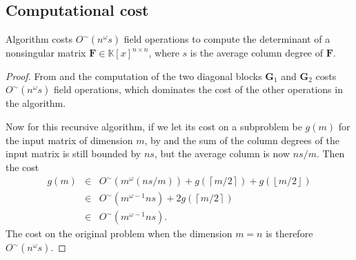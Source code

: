 
\subsection{Computational cost}
\begin{thm}
\label{thm:diagonalCost} Algorithm  %
costs $O^{\sim}\left(n^{\omega}s\right)$ field operations to compute
the determinant of a nonsingular matrix $\mathbf{F}\in\mathbb{K}\left[x\right]^{n\times n}$,
where $s$ is the average column degree of $\mathbf{F}$. \end{thm}
\begin{proof}
From  and 
the computation of the two diagonal blocks $\mathbf{G}_{1}$ and $\mathbf{G}_{2}$
costs $O^{\sim}\left(n^{\omega}s\right)$ field operations, which
dominates the cost of the other operations in the algorithm. 

Now for this recursive algorithm, if we let its cost on a subproblem
be $g(m)$ for the input matrix of dimension $m$, by 
and  the sum of the column degrees
of the input matrix is still bounded by $ns$, but the average column
is now $ns/m$. Then the cost 
\begin{eqnarray*}
g(m) & \in & O^{\sim}(m^{\omega}\left(ns/m\right))+g(\left\lceil m/2\right\rceil )+g(\left\lfloor m/2\right\rfloor )\\
 & \in & O^{\sim}(m^{\omega-1}ns)+2g(\left\lceil m/2\right\rceil )\\
 & \in & O^{\sim}(m^{\omega-1}ns).
\end{eqnarray*}
 The cost on the original problem when the dimension $m=n$ is therefore
$O^{\sim}\left(n^{\omega}s\right)$. %
\end{proof}

